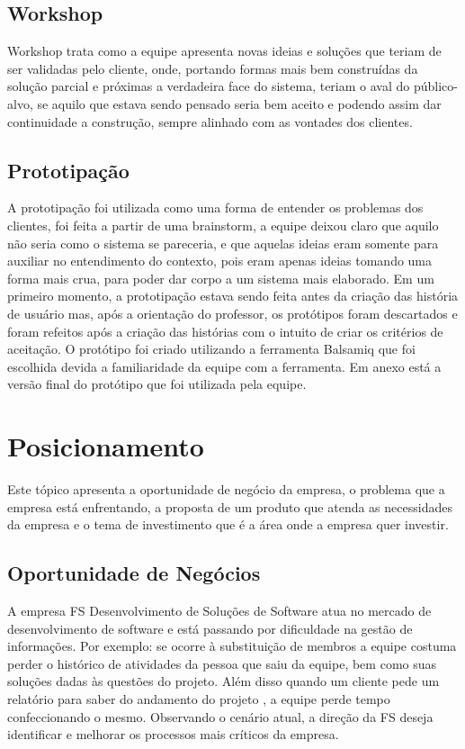 \subsection{Workshop}
Workshop trata como a equipe apresenta novas ideias e soluções que teriam de ser validadas pelo cliente, onde, portando formas mais bem construídas  da solução parcial e próximas a verdadeira face do sistema, teriam o aval do público-alvo, se aquilo que estava sendo pensado seria bem aceito e podendo assim dar continuidade a construção, sempre alinhado com as vontades dos clientes.

\subsection{Prototipação}
A prototipação foi utilizada como uma forma de entender os problemas dos clientes, foi feita a partir de uma brainstorm, a equipe deixou claro que aquilo não seria como o sistema se pareceria, e que aquelas ideias eram somente para auxiliar no entendimento do contexto, pois eram apenas ideias tomando uma forma mais crua, para poder dar corpo a um sistema mais elaborado. Em um primeiro momento, a prototipação estava sendo feita antes da criação das história de usuário mas, após a orientação do professor, os protótipos foram descartados e foram refeitos após a criação das histórias com o intuito de criar os critérios de aceitação. O protótipo foi criado utilizando a ferramenta Balsamiq que foi escolhida devida a familiaridade da equipe com a ferramenta. Em anexo está a versão final do protótipo que foi utilizada pela equipe.

\section{Posicionamento}
Este tópico apresenta a oportunidade de negócio da empresa, o problema que a empresa está enfrentando, a proposta de um produto que atenda as necessidades da empresa e o tema de investimento que é a área onde a empresa quer investir.

\subsection{Oportunidade de Negócios}
A empresa FS Desenvolvimento de Soluções de Software atua no mercado de desenvolvimento de software e está passando  por dificuldade na gestão de informações. Por exemplo: se ocorre à substituição de  membros  a  equipe costuma perder o histórico de atividades da pessoa que saiu da equipe, bem como suas soluções dadas às questões do projeto. Além disso quando um cliente pede um relatório para saber do andamento do projeto , a equipe perde tempo confeccionando o mesmo. Observando o cenário atual, a direção da FS deseja identificar e melhorar os processos mais críticos da empresa.

